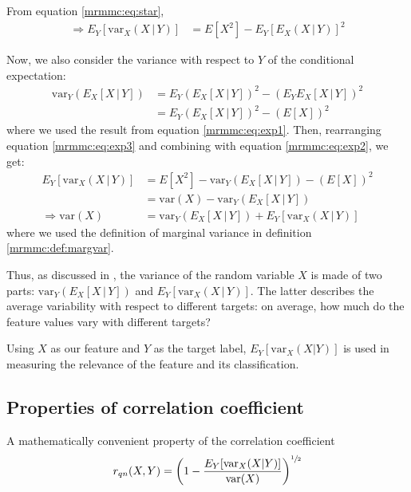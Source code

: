 \documentclass[12pt, twoside, a4paper]{report}
\def\var{\text{var}}
\begin{document}
From equation \ref{mrmmc:eq:star},
\begin{align}
\Rightarrow E_Y [ \var_X(X \, | \, Y) ] &= E[X^2] - E_Y [ E_X(X\,|\,Y) ] ^2 \label{mrmmc:eq:exp2}
\end{align}

Now, we also consider the variance with respect to $Y$ of the conditional expectation:
\begin{align}
\var_Y (E_X[X \, | \, Y]) &= E_Y \left( E_X[X \, | \, Y]\right)^2 - \left( E_YE_X[X \, | \, Y] \right)^2 \nonumber \\
&= E_Y \left( E_X[X \, | \, Y]\right)^2 - \left( E[X] \right)^2 \label{mrmmc:eq:exp3}
\end{align}
where we used the result from equation \ref{mrmmc:eq:exp1}. Then, rearranging equation \ref{mrmmc:eq:exp3} and combining with equation \ref{mrmmc:eq:exp2}, we get:
\begin{align*}
E_Y [ \var_X(X \, | \, Y) ] &= E[X^2] - \var_Y (E_X[X \, | \, Y]) - \left( E[X] \right)^2 \\
&= \var(X) - \var_Y (E_X[X \, | \, Y]) \\
\Rightarrow \var(X) &= \var_Y (E_X[X \, | \, Y]) + E_Y [ \var_X(X \, | \, Y) ]
\end{align*}
where we used the definition of marginal variance in definition \ref{mrmmc:def:margvar}.

Thus, as discussed in \cite{RefWorks:187}, the variance of the random variable $X$ is made of two parts: $\var_Y (E_X[X \, | \, Y])$ and $E_Y [ \var_X(X \, | \, Y) ]$. The latter describes the average variability with respect to different targets: on average, how much do the feature values vary with different targets?

  

Using $X$ as our feature and $Y$ as the target label, $E_Y[\var_X(X|Y)]$ is used in measuring the relevance of the feature and its classification.

\subsection{Properties of correlation coefficient}
A mathematically convenient property of the correlation coefficient
\begin{align*}
r_{qn}(X, Y) = \left( 1 - \frac{E_Y[\var_X(X|Y)]}{\var(X)} \right)^{\sfrac{1}{2}}
\end{align*}
\end{document}
